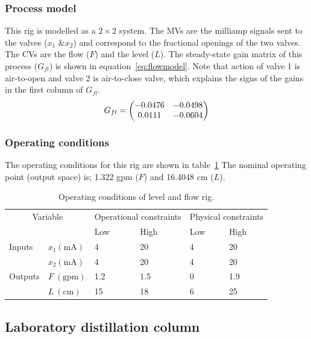 \subsubsection{Process model}
This rig is modelled as a $2\times2$ system.
The MVs are the milliamp signals sent to the valves ($x_1\text{ \& }x_2$) and correspond to the fractional openings of the two valves.
The CVs are the flow ($F$) and the level ($L$).
The steady-state gain matrix of this process ($G_{fl}$) is shown in equation~\ref{eq:flowmodel}.
Note that action of valve 1 is air-to-open and valve 2 is air-to-close valve, which explains the signs of the gains in the first column of $G_{fl}$.
\begin{equation}
  \label{eq:flowmodel}
    G_{fl} = \bpm -0.0476 & -0.0498 \\      %
                  0.0111 & -0.0604 \\ \epm %
\end{equation}
\subsubsection{Operating conditions}
The operating conditions for this rig are shown in table~\ref{tab:flowopcon}
The nominal operating point (output space) is; 1.322 gpm ($F$) and 16.4048 cm ($L$).
\begin{table}[htbp]
  \centering
  \begin{tabular}{llllll}
    \toprule
    \multicolumn{2}{c}{Variable} & \multicolumn{2}{c}{Operational constraints} & \multicolumn{2}{c}{Physical constraints} \\
    && Low & High & Low & High \\ 
    \midrule
    Inputs &$x_1 (\text{mA})$ & 4 & 20 & 4 & 20 \\
           &$x_2 (\text{mA})$ & 4 & 20 & 4 & 20 \\[1.3ex]
    Outputs &$F~(\text{gpm})$ & 1.2 & 1.5 & 0 & 1.9 \\
            &$L~(\text{cm})$  & 15 & 18 & 6 & 25 \\
    \bottomrule
  \end{tabular}
  \caption{Operating conditions of level and flow rig.}
  \label{tab:flowopcon}
\end{table}

\subsection{Laboratory distillation column}
